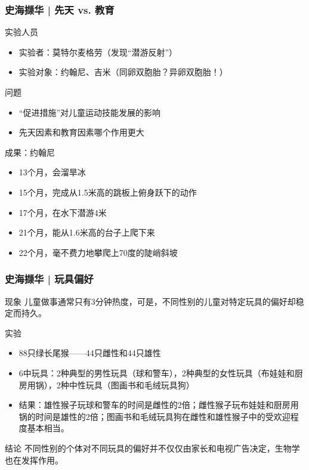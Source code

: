\begin{frame}
  \frametitle{史海撷华 | 先天 vs. 教育}
  \begin{block}{实验人员}
    \begin{itemize}
      \item 实验者：莫特尔\textbullet 麦格劳（发现“潜游反射”）
      \item 实验对象：约翰尼、吉米（同卵双胞胎？异卵双胞胎！）
    \end{itemize}
  \end{block}
  \pause
  \begin{block}{问题}
    \begin{itemize}
      \item “促进措施”对儿童运动技能发展的影响
      \item 先天因素和教育因素哪个作用更大
    \end{itemize}
  \end{block}
  \pause
  \begin{block}{成果：约翰尼}
    \begin{itemize}
      \item 13个月，会溜旱冰
      \item 15个月，完成从1.5米高的跳板上俯身跃下的动作
      \item 17个月，在水下潜游4米
      \item 21个月，能从1.6米高的台子上爬下来
      \item 22个月，毫不费力地攀爬上70度的陡峭斜坡
    \end{itemize}
  \end{block}
\end{frame}

\begin{frame}
  \frametitle{史海撷华 | 玩具偏好}
  \begin{block}{现象}
    儿童做事通常只有3分钟热度，可是，不同性别的儿童对特定玩具的偏好却稳定而持久。
  \end{block}
  \vspace{-0.5em}
  \pause
  \begin{block}{实验}
    \begin{itemize}
      \item 88只绿长尾猴——44只雌性和44只雄性
      \item 6中玩具：2种典型的男性玩具（球和警车），2种典型的女性玩具（布娃娃和厨房用锅），2种中性玩具（图画书和毛绒玩具狗）
      \item 结果：雄性猴子玩球和警车的时间是雌性的2倍；雌性猴子玩布娃娃和厨房用锅的时间是雄性的2倍；图画书和毛绒玩具狗在雌性和雄性猴子中的受欢迎程度基本相当。
    \end{itemize}
  \end{block}
  \vspace{-0.5em}
  \pause
  \begin{block}{结论}
    不同性别的个体对不同玩具的偏好并不仅仅由家长和电视广告决定，生物学也在发挥作用。
  \end{block}
\end{frame}



